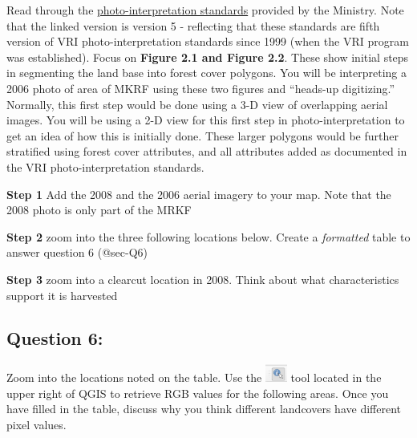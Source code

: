 \documentclass[
  letterpaper,
]{book}
\begin{document}

Read through the
\href{https://www2.gov.bc.ca/assets/gov/farming-natural-resources-and-industry/forestry/stewardship/forest-analysis-inventory/forest-cover-inventories/photo-interpretation/standards/vri_photo_interpretation_procedures_version_39.pdf\#page=21.84}{photo-interpretation
standards} provided by the Ministry. Note that the linked version is
version 5 - reflecting that these standards are fifth version of VRI
photo-interpretation standards since 1999 (when the VRI program was
established). Focus on \textbf{Figure 2.1 and Figure 2.2}. These show
initial steps in segmenting the land base into forest cover polygons.
You will be interpreting a 2006 photo of area of MKRF using these two
figures and ``heads-up digitizing.'' Normally, this first step would be
done using a 3-D view of overlapping aerial images. You will be using a
2-D view for this first step in photo-interpretation to get an idea of
how this is initially done. These larger polygons would be further
stratified using forest cover attributes, and all attributes added as
documented in the VRI photo-interpretation standards.

\textbf{Step 1} Add the 2008 and the 2006 aerial imagery to your map.
Note that the 2008 photo is only part of the MRKF

\textbf{Step 2} zoom into the three following locations below. Create a
\emph{formatted} table to answer question 6 (@sec-Q6)

\textbf{Step 3} zoom into a clearcut location in 2008. Think about what
characteristics support it is harvested

\hypertarget{sec-Q6}{%
\subsection*{Question 6:}\label{sec-Q6}}

Zoom into the locations noted on the table. Use the
\includegraphics[width=0.28125in,height=\textheight]{images/clipboard-1450729439.png}
tool located in the upper right of QGIS to retrieve RGB values for the
following areas. Once you have filled in the table, discuss why you
think different landcovers have different pixel values.
\end{document}

